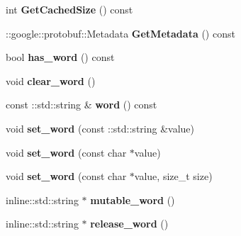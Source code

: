 \begin{DoxyCompactItemize}
\item 
\hypertarget{classlattice_1_1Subword_a93f2c5e53295755297f658ec54e81283}{
int {\bfseries GetCachedSize} () const }
\label{classlattice_1_1Subword_a93f2c5e53295755297f658ec54e81283}

\item 
\hypertarget{classlattice_1_1Subword_a82569d1cb47ab62caa9cadcaf45c07b0}{
::google::protobuf::Metadata {\bfseries GetMetadata} () const }
\label{classlattice_1_1Subword_a82569d1cb47ab62caa9cadcaf45c07b0}

\item 
\hypertarget{classlattice_1_1Subword_aa069cfdde7b9063126104f005aac89cb}{
bool {\bfseries has\_\-word} () const }
\label{classlattice_1_1Subword_aa069cfdde7b9063126104f005aac89cb}

\item 
\hypertarget{classlattice_1_1Subword_a0a849e147bf2c78d785197b897b14e53}{
void {\bfseries clear\_\-word} ()}
\label{classlattice_1_1Subword_a0a849e147bf2c78d785197b897b14e53}

\item 
\hypertarget{classlattice_1_1Subword_a2853badbab594ed129df0df6a0e97b65}{
const ::std::string \& {\bfseries word} () const }
\label{classlattice_1_1Subword_a2853badbab594ed129df0df6a0e97b65}

\item 
\hypertarget{classlattice_1_1Subword_a2b2aeb43d13e2e7e57b06afa5d0e50ec}{
void {\bfseries set\_\-word} (const ::std::string \&value)}
\label{classlattice_1_1Subword_a2b2aeb43d13e2e7e57b06afa5d0e50ec}

\item 
\hypertarget{classlattice_1_1Subword_aeeff8037e9406ee50534fbe6e1f6e702}{
void {\bfseries set\_\-word} (const char $\ast$value)}
\label{classlattice_1_1Subword_aeeff8037e9406ee50534fbe6e1f6e702}

\item 
\hypertarget{classlattice_1_1Subword_a3d6126168fe9ce91049687370dcb4977}{
void {\bfseries set\_\-word} (const char $\ast$value, size\_\-t size)}
\label{classlattice_1_1Subword_a3d6126168fe9ce91049687370dcb4977}

\item 
\hypertarget{classlattice_1_1Subword_a4495efa4267a4b124bba594f91bd73fe}{
inline::std::string $\ast$ {\bfseries mutable\_\-word} ()}
\label{classlattice_1_1Subword_a4495efa4267a4b124bba594f91bd73fe}

\item 
\hypertarget{classlattice_1_1Subword_ad6cb356c802ac727d24df1e2cd9ca9ed}{
inline::std::string $\ast$ {\bfseries release\_\-word} ()}
\label{classlattice_1_1Subword_ad6cb356c802ac727d24df1e2cd9ca9ed}


\end{DoxyCompactItemize}
